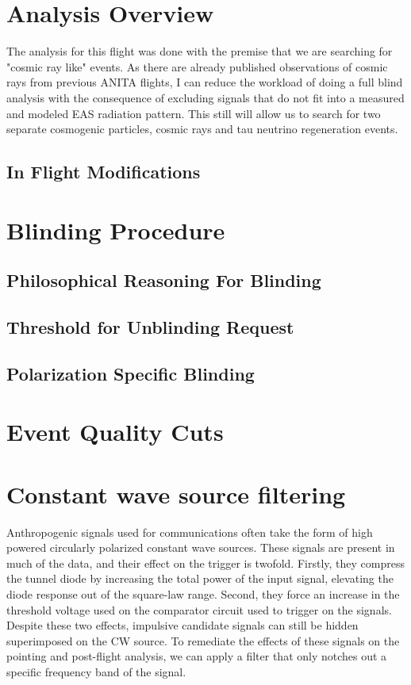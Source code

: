 \section{Analysis Overview}
	The analysis for this flight was done with the premise that we are searching for "cosmic ray like" events.  As there are already published observations of cosmic rays from previous ANITA flights, I can reduce the workload of doing a full blind analysis with the consequence of excluding signals that do not fit into a measured and modeled EAS radiation pattern.  This still will allow us to search for two separate cosmogenic particles, cosmic rays and tau neutrino regeneration events.

	\subsection{In Flight Modifications}
	
\section{Blinding Procedure}

	\subsection{Philosophical Reasoning For Blinding}
	
	\subsection{Threshold for Unblinding Request}

	\subsection{Polarization Specific Blinding}

\section{Event Quality Cuts}

\section{Constant wave source filtering}
	Anthropogenic signals used for communications often take the form of high powered circularly polarized constant wave sources.  These signals are present in much of the data, and their effect on the trigger is twofold.  Firstly, they compress the tunnel diode by increasing the total power of the input signal, elevating the diode response out of the square-law range.  Second, they force an increase in the threshold voltage used on the comparator circuit used to trigger on the signals.  Despite these two effects, impulsive candidate signals can still be hidden superimposed on the CW source.  To remediate the effects of these signals on the pointing and post-flight analysis, we can apply a filter that only notches out a specific frequency band of the signal.
